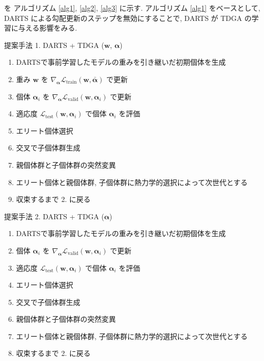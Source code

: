 \noindent
を アルゴリズム \ref{alg1}, \ref{alg2}, \ref{alg3} に示す.
アルゴリズム \ref{alg1} をベースとして, DARTS による勾配更新のステップを無効にすることで,
DARTS が TDGA の学習に与える影響をみる.

\begin{algorithm}[tb]
  \caption{提案手法 1. DARTS + TDGA ($\bm{w}$, $\bm{\alpha}$)}
  \label{alg1}
  \begin{enumerate}
    \item DARTSで事前学習したモデルの重みを引き継いだ初期個体を生成
    \item 重み $\bm{w}$ を $\displaystyle \nabla_{\bm{\alpha}} \mathcal{L}_{\mathrm{train}}(\bm{w}, \bar{\bm{\alpha}})$ で更新
    \item 個体 $\bm{\alpha}_i$ を $\displaystyle \nabla_{\bm{\alpha}} \mathcal{L}_{\mathrm{valid}}(\bm{w}, \bm{\alpha}_i)$ で更新
    \item 適応度 $\displaystyle \mathcal{L}_{\mathrm{test}}(\bm{w}, \bm{\alpha}_i)$ で個体 $\bm{\alpha}_i$ を評価
    \item エリート個体選択
    \item 交叉で子個体群生成
    \item 親個体群と子個体群の突然変異
    \item エリート個体と親個体群, 子個体群に熱力学的選択によって次世代とする
    \item 収束するまで 2. に戻る
  \end{enumerate}
\end{algorithm}


\begin{algorithm}[tb]
  \caption{提案手法 2. DARTS + TDGA ($\bm{\alpha}$)}
  \label{alg2}
  \begin{enumerate}
    \item DARTSで事前学習したモデルの重みを引き継いだ初期個体を生成
    \item 個体 $\bm{\alpha}_i$ を $\displaystyle \nabla_{\bm{\alpha}} \mathcal{L}_{\mathrm{valid}}(\bm{w}, \bm{\alpha}_i)$ で更新
    \item 適応度 $\displaystyle \mathcal{L}_{\mathrm{test}}(\bm{w}, \bm{\alpha}_i)$ で個体 $\bm{\alpha}_i$ を評価
    \item エリート個体選択
    \item 交叉で子個体群生成
    \item 親個体群と子個体群の突然変異
    \item エリート個体と親個体群, 子個体群に熱力学的選択によって次世代とする
    \item 収束するまで 2. に戻る
  \end{enumerate}
\end{algorithm}

